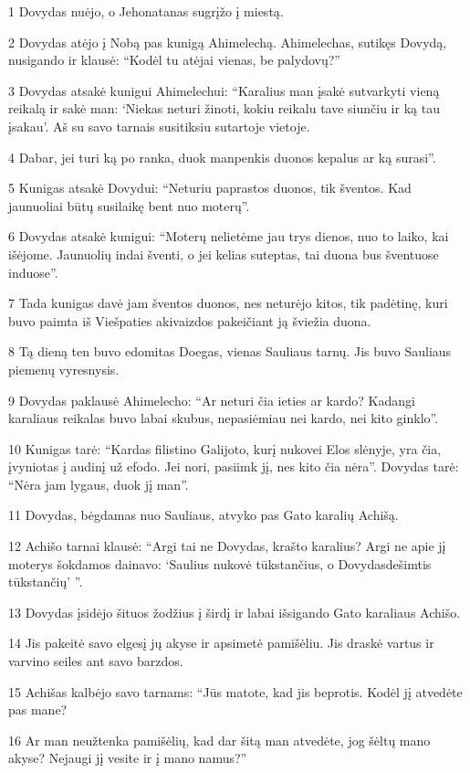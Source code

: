 \par 1 Dovydas nuėjo, o Jehonatanas sugrįžo į miestą. 
\par 2 Dovydas atėjo į Nobą pas kunigą Ahimelechą. Ahimelechas, sutikęs Dovydą, nusigando ir klausė: “Kodėl tu atėjai vienas, be palydovų?” 
\par 3 Dovydas atsakė kunigui Ahimelechui: “Karalius man įsakė sutvarkyti vieną reikalą ir sakė man: ‘Niekas neturi žinoti, kokiu reikalu tave siunčiu ir ką tau įsakau’. Aš su savo tarnais susitiksiu sutartoje vietoje. 
\par 4 Dabar, jei turi ką po ranka, duok man­penkis duonos kepalus ar ką surasi”. 
\par 5 Kunigas atsakė Dovydui: “Neturiu paprastos duonos, tik šventos. Kad jaunuoliai būtų susilaikę bent nuo moterų”. 
\par 6 Dovydas atsakė kunigui: “Moterų nelietėme jau trys dienos, nuo to laiko, kai išėjome. Jaunuolių indai šventi, o jei kelias suteptas, tai duona bus šventuose induose”. 
\par 7 Tada kunigas davė jam šventos duonos, nes neturėjo kitos, tik padėtinę, kuri buvo paimta iš Viešpaties akivaizdos pakeičiant ją šviežia duona. 
\par 8 Tą dieną ten buvo edomitas Doegas, vienas Sauliaus tarnų. Jis buvo Sauliaus piemenų vyresnysis. 
\par 9 Dovydas paklausė Ahimelecho: “Ar neturi čia ieties ar kardo? Kadangi karaliaus reikalas buvo labai skubus, nepasiėmiau nei kardo, nei kito ginklo”. 
\par 10 Kunigas tarė: “Kardas filistino Galijoto, kurį nukovei Elos slėnyje, yra čia, įvyniotas į audinį už efodo. Jei nori, pasiimk jį, nes kito čia nėra”. Dovydas tarė: “Nėra jam lygaus, duok jį man”. 
\par 11 Dovydas, bėgdamas nuo Sauliaus, atvyko pas Gato karalių Achišą. 
\par 12 Achišo tarnai klausė: “Argi tai ne Dovydas, krašto karalius? Argi ne apie jį moterys šokdamos dainavo: ‘Saulius nukovė tūkstančius, o Dovydas­dešimtis tūkstančių’ ”. 
\par 13 Dovydas įsidėjo šituos žodžius į širdį ir labai išsigando Gato karaliaus Achišo. 
\par 14 Jis pakeitė savo elgesį jų akyse ir apsimetė pamišėliu. Jis draskė vartus ir varvino seiles ant savo barzdos. 
\par 15 Achišas kalbėjo savo tarnams: “Jūs matote, kad jis beprotis. Kodėl jį atvedėte pas mane? 
\par 16 Ar man neužtenka pamišėlių, kad dar šitą man atvedėte, jog šėltų mano akyse? Nejaugi jį vesite ir į mano namus?”



